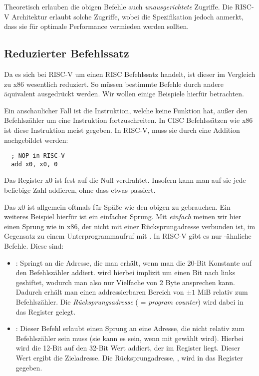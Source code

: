 Theoretisch erlauben die obigen Befehle auch \emph{unausgerichtete}
Zugriffe. Die RISC-V Architektur erlaubt solche Zugriffe, wobei die
Spezifikation jedoch anmerkt, dass sie für optimale Performance vermieden werden
sollten.

\subsection{Reduzierter Befehlssatz}

Da es sich bei RISC-V um einen RISC Befehlssatz handelt, ist dieser im Vergleich
zu x86 wesentlich reduziert. So müssen bestimmte Befehle durch andere äquivalent
ausgedrückt werden. Wir wollen einige Beispiele hierfür betrachten.

Ein anschaulicher Fall ist die  Instruktion, welche keine Funktion
hat, außer den Befehlszähler um eine Instruktion fortzuschreiten. In CISC
Befehlssätzen wie x86 ist diese Instruktion meist gegeben. In RISC-V, muss sie
durch eine Addition nachgebildet werden:

\begin{lstlisting}
  ; NOP in RISC-V
  add x0, x0, 0
\end{lstlisting}

Das Register x0 ist fest auf die Null verdrahtet. Insofern kann man auf sie
jede beliebige Zahl addieren, ohne dass etwas passiert.

Das x0 ist allgemein oftmals für Späße wie den obigen zu gebrauchen. Ein
weiteres Beispiel hierfür ist ein einfacher Sprung. Mit \emph{einfach} meinen
wir hier einen Sprung wie  in x86, der nicht mit einer
Rücksprungadresse verbunden ist, im Gegensatz zu einem Unterprogrammaufruf mit
. In RISC-V gibt es nur -ähnliche Befehle. Diese sind:

\begin{itemize}
  \item {}: Springt an die Adresse, die man
    erhält, wenn man die 20-Bit Konstante  auf den Befehlszähler
    addiert.  wird hierbei implizit um einen Bit nach links
    geshiftet, wodurch man also nur Vielfache von 2 Byte ansprechen
    kann. Dadurch erhält man einen addressierbaren Bereich von $\pm 1$ MiB
    relativ zum Befehlszähler. Die \emph{Rücksprungsadresse} 
    ( = \emph{program counter}) wird dabei in das Register
     gelegt.
 \item {}: Dieser Befehl erlaubt einen Sprung an eine Adresse, die nicht relativ zum Befehlszähler sein muss (sie
   kann es sein, wenn  mit  gewählt wird). Hierbei wird
   die 12-Bit  auf den 32-Bit Wert addiert, der im Register
    liegt. Dieser Wert ergibt die Zieladresse. Die
   Rücksprungadresse, , wird in das Register 
   gegeben.
\end{itemize}

